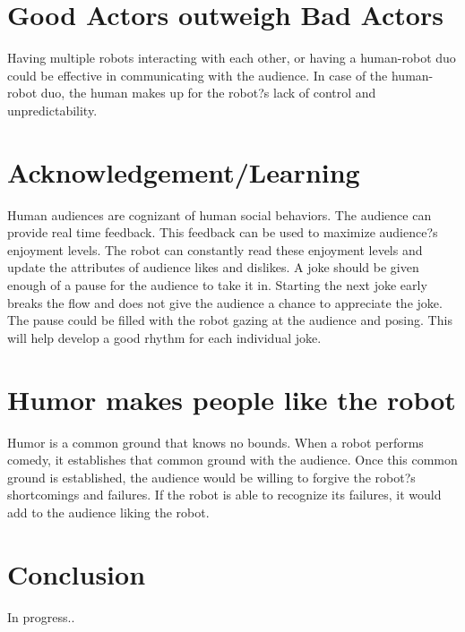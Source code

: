 \documentclass[onecolumn, draftclsnofoot,10pt, compsoc]{IEEEtran}
\begin{document}
\section{Good Actors outweigh Bad Actors}
	Having multiple robots interacting with each other, or having a human-robot duo could be effective in communicating with the audience. In case of the human-robot duo, the human makes up for the robot?s lack of control and unpredictability. 
	
\section{Acknowledgement/Learning}
	Human audiences are cognizant of human social behaviors. The audience can provide real time feedback. This feedback can be used to maximize audience?s enjoyment levels. The robot can constantly read these enjoyment levels and update the attributes of audience likes and dislikes. A joke should be given enough of a pause for the audience to take it in. Starting the next joke early breaks the flow and does not give the audience a chance to appreciate the joke. The pause could be filled with the robot gazing at the audience and posing. This will help develop a good rhythm for each individual joke.
	
\section{Humor makes people like the robot}
	Humor is a common ground that knows no bounds. When a robot performs comedy, it establishes that common ground with the audience. Once this common ground is established, the audience would be willing to forgive the robot?s shortcomings and failures. If the robot is able to recognize its failures, it would add to the audience liking the robot. 
	
\section{Conclusion}
	In progress..
	
	
	

\pagebreak




\end{document}

